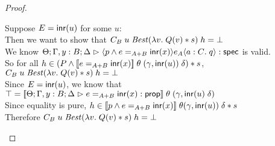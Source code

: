 \begin{proof}
\begin{tabbedproof}
\oooo Suppose $E = \inr(u)$ for some $u$:  \\
\ooooo Then we want to show that $C_B\;u\;\mathit{Best}(\semfun{v}{Q(v)*s})\;h = \bot$\\
\ooooo We know $\judgeS[\Theta; \Gamma, y:B; \Delta]{\mspec{p \land e =_{A+B} \inr(x)}{e_A}{a:C}{q}}$ is valid. \\
\ooooo So for all $h \in (P \land \interp{e =_{A+B} \inr(x)}\;\theta\;(\gamma,\inr(u))\;\delta) * s$, $C_B\;u\;\mathit{Best}(\semfun{v}{Q(v)*s})\;h = \bot$\\
\ooooo Since $E=\inr(u)$, we know that $\top = \interp{\judgeA[\Theta; \Gamma, y:B; \Delta]{e=_{A+B}\inr(x)}{\assert}}\;\theta\;(\gamma,\inr(u)\;\delta)$\\
\ooooo Since equality is pure, $h \in \interp{p \land e =_{A+B} \inr(x)}\;\theta(\gamma,\inr(u))\;\delta * s$ \\
\ooooo Therefore $C_B\;u\;\mathit{Best}(\semfun{v}{Q(v)*s})\;h = \bot$\\

\end{tabbedproof}
\end{proof}

